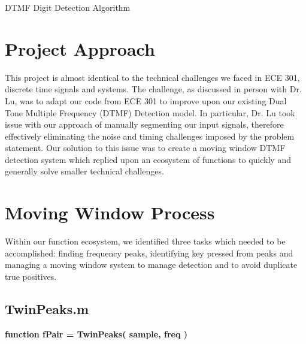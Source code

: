 




%
%

\begin{Large}\begin{center}
DTMF Digit Detection Algorithm
\end{center}\end{Large}


%
%

\section{Project Approach}

This project is almost identical to the technical challenges we faced in ECE 301, discrete time signals and systems. The challenge, as discussed in person with Dr. Lu, was to adapt our code from ECE 301 to improve upon our existing Dual Tone Multiple Frequency (DTMF) Detection model. In particular, Dr. Lu took issue with our approach of manually segmenting our input signals, therefore effectively eliminating the noise and timing challenges imposed by the problem statement. Our solution to this issue was to create a moving window DTMF detection system which replied upon an ecosystem of functions to quickly and generally solve smaller technical challenges.


%
%

\section{Moving Window Process}

Within our function ecosystem, we identified three tasks which needed to be accomplished: finding frequency peaks, identifying key pressed from peaks and managing a moving window system to manage detection and to avoid duplicate true positives.


\subsection{TwinPeaks.m}
\label{TwinPeaks}

\vspace{-0.1cm}
\textbf{function fPair = TwinPeaks( sample, freq )}
\vspace{0.3cm}

